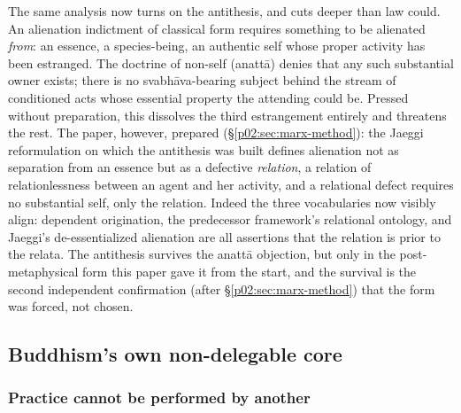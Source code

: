 The same analysis now turns on the antithesis, and cuts deeper than law could. An alienation indictment of classical form requires something to be alienated \emph{from}: an essence, a species-being, an authentic self whose proper activity has been estranged. The doctrine of non-self (anatt\=a) denies that any such substantial owner exists; there is no svabh\=ava-bearing subject behind the stream of conditioned acts whose essential property the attending could be. Pressed without preparation, this dissolves the third estrangement entirely and threatens the rest. The paper, however, prepared (\S\ref{p02:sec:marx-method}): the Jaeggi reformulation on which the antithesis was built defines alienation not as separation from an essence but as a defective \emph{relation}, a relation of relationlessness between an agent and her activity, and a relational defect requires no substantial self, only the relation. Indeed the three vocabularies now visibly align: dependent origination, the predecessor framework's relational ontology, and Jaeggi's de-essentialized alienation are all assertions that the relation is prior to the relata. The antithesis survives the anatt\=a objection, but only in the post-metaphysical form this paper gave it from the start, and the survival is the second independent confirmation (after \S\ref{p02:sec:marx-method}) that the form was forced, not chosen.

\subsection{Buddhism's own non-delegable core}
\label{p02:sec:buddhism-core}

\subsubsection{Practice cannot be performed by another}
\label{p02:sec:buddhism-practice}

